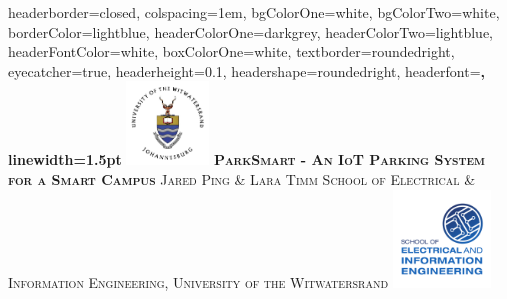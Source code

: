 \documentclass[landscape,a1paper,fontscale=0.47]{baposter} %
\begin{document}
\begin{poster}
{
headerborder=closed, %
colspacing=1em, %
bgColorOne=white, %
bgColorTwo=white, %
borderColor=lightblue, %
headerColorOne=darkgrey, %
headerColorTwo=lightblue, %
headerFontColor=white, %
boxColorOne=white, %
textborder=roundedright, %
eyecatcher=true, %
headerheight=0.1\textheight, %
headershape=roundedright, %
headerfont=\Large\bf\textsc, %
linewidth=1.5pt %
}
%
{\includegraphics[height = 6em]{wits-logo-1.jpg}} %
{\bf\textsc{ParkSmart - An IoT Parking System for a Smart Campus }\vspace{0.5em}} %
{\textsc{ Jared Ping \& Lara Timm  \hspace{5pt} \normalsize{School of Electrical \& Information Engineering, University of the Witwatersrand}}} %
{\includegraphics[height=7em]{eie-logo.pdf}} %



\end{poster}
\end{document}
